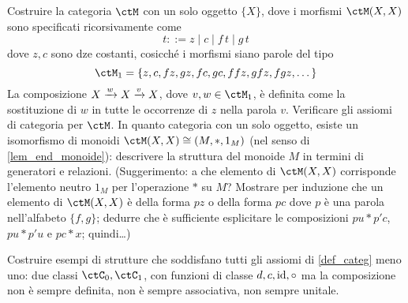 \begin{esercizi}
	\item \label{jgdasoh_3} Costruire la categoria \(\ctM\) con un solo oggetto \(\{X\}\), dove i morfismi \(\Hom\ctM(X,X)\) sono specificati ricorsivamente come
	\[t ::= z \mid c \mid f \, t \mid g \, t \]
	dove \(z,c\) sono dze costanti, cosicché i morfismi siano parole del tipo
	\[\ctM_1=\{z,c,fz,gz,fc,gc,ffz,gfz,fgz,\dots\}\]
	La composizione \(X \xrightarrow{w} X \xrightarrow{v} X\), dove \(v,w\in\ctM_1\), è definita come la sostituzione di \(w\) in tutte le occorrenze di \(z\) nella parola \(v\). Verificare gli assiomi di categoria per \(\ctM\). In quanto categoria con un solo oggetto, esiste un isomorfismo di monoidi \(\ctM(X,X) \cong (M,\ast,1_M)\) (nel senso di \ref{lem_end_monoide}): descrivere la struttura del monoide \(M\) in termini di generatori e relazioni. (Suggerimento: a che elemento di \(\ctM(X,X)\) corrisponde l'elemento neutro \(1_M\) per l'operazione \(*\) su \(M\)? Mostrare per induzione che un elemento di \(\ctM(X,X)\) è della forma \(pz\) o della forma \(pc\) dove \(p\) è una parola nell'alfabeto \(\{f,g\}\); dedurre che è sufficiente esplicitare le composizioni \(pu * p'c\), \(pu * p'u\) e \(pc * x\); quindi\dots)
	\item \label{jgdasoh_5} Costruire esempi di strutture che soddisfano tutti gli assiomi di \ref{def_categ} meno uno: due classi \(\ctC_0,\ctC_1\), con funzioni di classe \(d,c,\mathrm{id},\circ\) ma la composizione non è sempre definita, non è sempre associativa, non sempre unitale.
\end{esercizi}
